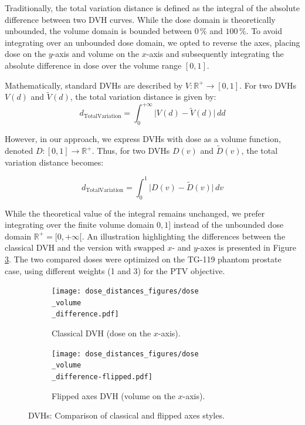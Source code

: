 Traditionally, the total variation distance is defined as the integral of the absolute difference between two DVH curves.
While the dose domain is theoretically unbounded, the volume domain is bounded between $0\,\%$ and $100\,\%$.
To avoid integrating over an unbounded dose domain, we opted to reverse the axes, placing dose on the $y$-axis and volume on the $x$-axis and subsequently integrating the absolute difference in dose over the volume range $[0,1]$.

Mathematically, standard DVHs are described by $V: \mathbb{R}^+ \to [0,1]$.
For two DVHs $V(d)$ and $\tilde{V}(d)$, the total variation distance is given by:
$$
d_{\text{TotalVariation}} = \int_{0}^{+\infty} \lvert V(d) - \tilde{V}(d) \rvert \, dd
$$

However, in our approach, we express DVHs with dose as a volume function, denoted $D: [0,1] \to \mathbb{R}^+$.
Thus, for two DVHs $D(v)$ and $\tilde{D}(v)$, the total variation distance becomes:

$$
d_{\text{TotalVariation}} = \int_{0}^{1} \lvert D(v) - \tilde{D}(v) \rvert \, dv
$$

While the theoretical value of the integral remains unchanged, we prefer integrating over the finite volume domain $0,1]$ instead of the unbounded dose domain $\mathbb{R}^+ = [0,+\infty[$.
An illustration highlighting the differences between the classical DVH and the version with swapped $x$- and $y$-axes is presented in Figure \ref{fig:dose_volume_difference}.
The two compared doses were optimized on the TG-119 phantom prostate case, using different weights (1 and 3) for the PTV objective.

\begin{figure}
	\centering
	\begin{subfigure}[c]{0.95\textwidth}
		\texttt{[image: dose\_distances\_figures/dose\\\_volume\\\_difference.pdf]}
		\caption{Classical DVH (dose on the $x$-axis).}
		\label{fig:dose_volume_difference-normal}
	\end{subfigure}
	\begin{subfigure}[c]{0.95\textwidth}
		\texttt{[image: dose\_distances\_figures/dose\\\_volume\\\_difference-flipped.pdf]}
		\caption{Flipped axes DVH (volume on the $x$-axis).}
		\label{fig:dose_volume_difference-flipped}
	\end{subfigure}
	\caption{DVHs: Comparison of classical and flipped axes styles.}
	\label{fig:dose_volume_difference}
\end{figure}

